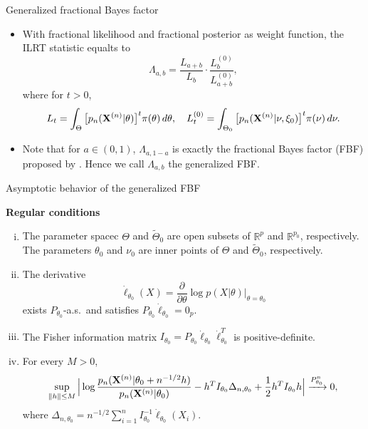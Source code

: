 \documentclass{beamer}
\theoremstyle{plain}
\theoremstyle{definition}
\theoremstyle{remark}
\begin{document}
\begin{frame}{Generalized fractional Bayes factor}

    \begin{itemize}
        \item
    With fractional likelihood and fractional posterior as weight function, the ILRT statistic equalts to
$$
    \Lambda_{a,b}=
    \frac{L_{a+b}}{L_{b}}\cdot \frac{L_{b}^{(0)}}{L_{a+b}^{(0)}},
$$
where for $t>0$,
 $$
 L_t=\int_{\Theta}\big[p_n(\mathbf{X}^{(n)}|\theta)\big]^t \pi(\theta)\, d\theta,\quad
 L_t^{(0)}=\int_{\Theta_0}\big[p_n(\mathbf{X}^{(n)}|\nu,\xi_0)\big]^t \pi(\nu)\, d\nu.
 $$
\item
    Note that for $a\in(0,1)$, $\Lambda_{a,1-a}$ is exactly the fractional Bayes factor (FBF) proposed by \cite{Fractional1995}.
Hence we call $\Lambda_{a,b}$ the generalized FBF.
    \end{itemize}
\end{frame}
\begin{frame}{Asymptotic behavior of the generalized FBF}
    
    \textbf{Regular conditions}

    \begin{enumerate}[(i)]
    \item
    The parameter spacec $\Theta$ and $\tilde{\Theta}_0$ are open subsets of $\mathbb{R}^p$ and $\mathbb{R}^{p_0}$, respectively.
    The parameters $\theta_0$ and $\nu_0$ are inner points of $\Theta$ and $\tilde{\Theta}_0$, respectively.
\item
    The derivative 
$$\dot{\ell}_{\theta_0}(X)=\frac{\partial}{\partial \theta}\log p(X|\theta)\Big|_{\theta=\theta_0}$$
exists $P_{\theta_0}$-a.s.\ and satisfies $P_{\theta_0}\dot{\ell}_{\theta_0}=0_p$.
\item
The Fisher information matrix $I_{\theta_0}=P_{\theta_0}\dot{\ell}_{\theta_0}\dot{\ell}_{\theta_0}^T$ is positive-definite.
\item
For every $M>0$,
    \begin{equation*}
        \sup_{\|h\|\leq M}\Big|
         \log \frac{p_n(\mathbf{X}^{(n)}|\theta_0+n^{-1/2}h)}{p_n(\mathbf{X}^{(n)}|\theta_0)}-h^T I_{\theta_0}\Delta_{n,\theta_0}+\frac{1}{2}h^T I_{\theta_0}h
         \Big|\xrightarrow{P^n_{\theta_0}}0,
    \end{equation*}
    where $\Delta_{n,\theta_0}=n^{-1/2}\sum_{i=1}^n I_{\theta_0}^{-1}\dot{\ell}_{\theta_0}(X_i)$.
\end{enumerate}

\end{frame}
\end{document}
